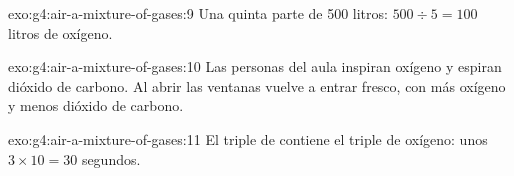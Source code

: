 \begin{solution}{exo:g4:air-a-mixture-of-gases:9}
Una quinta parte de 500 litros: $500 \div 5 = 100$ litros de oxígeno.
\end{solution}

\begin{solution}{exo:g4:air-a-mixture-of-gases:10}
Las personas del aula inspiran oxígeno y espiran dióxido de carbono. Al
abrir las ventanas vuelve a entrar  fresco, con más oxígeno y menos
dióxido de carbono.
\end{solution}

\begin{solution}{exo:g4:air-a-mixture-of-gases:11}
El triple de  contiene el triple de oxígeno: unos
$3 \times 10 = 30$ segundos.
\end{solution}
